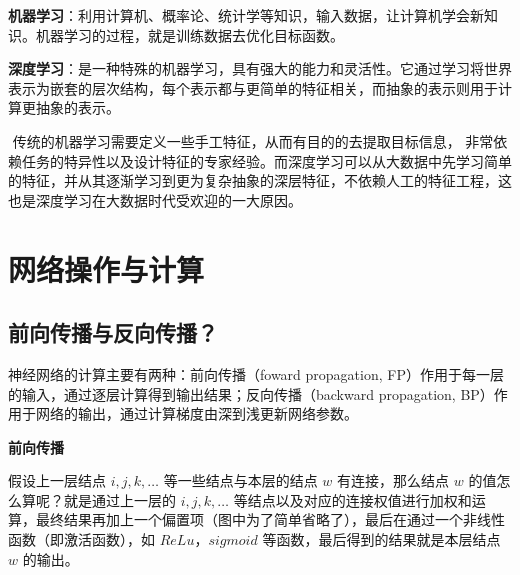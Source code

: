 ​
\textbf{机器学习}：利用计算机、概率论、统计学等知识，输入数据，让计算机学会新知识。机器学习的过程，就是训练数据去优化目标函数。

​
\textbf{深度学习}：是一种特殊的机器学习，具有强大的能力和灵活性。它通过学习将世界表示为嵌套的层次结构，每个表示都与更简单的特征相关，而抽象的表示则用于计算更抽象的表示。

​ 传统的机器学习需要定义一些手工特征，从而有目的的去提取目标信息，
非常依赖任务的特异性以及设计特征的专家经验。而深度学习可以从大数据中先学习简单的特征，并从其逐渐学习到更为复杂抽象的深层特征，不依赖人工的特征工程，这也是深度学习在大数据时代受欢迎的一大原因。

 

 

\section{网络操作与计算}\label{ux7f51ux7edcux64cdux4f5cux4e0eux8ba1ux7b97}

\subsection{前向传播与反向传播？}\label{ux524dux5411ux4f20ux64adux4e0eux53cdux5411ux4f20ux64ad}

神经网络的计算主要有两种：前向传播（foward propagation,
FP）作用于每一层的输入，通过逐层计算得到输出结果；反向传播（backward
propagation, BP）作用于网络的输出，通过计算梯度由深到浅更新网络参数。

\textbf{前向传播}

 

假设上一层结点 $ i,j,k,\ldots{} $ 等一些结点与本层的结点 $ w $
有连接，那么结点 $ w $ 的值怎么算呢？就是通过上一层的 $
i,j,k,\ldots{} $
等结点以及对应的连接权值进行加权和运算，最终结果再加上一个偏置项（图中为了简单省略了），最后在通过一个非线性函数（即激活函数），如
\(ReLu\)，\(sigmoid\) 等函数，最后得到的结果就是本层结点 $ w $
的输出。

